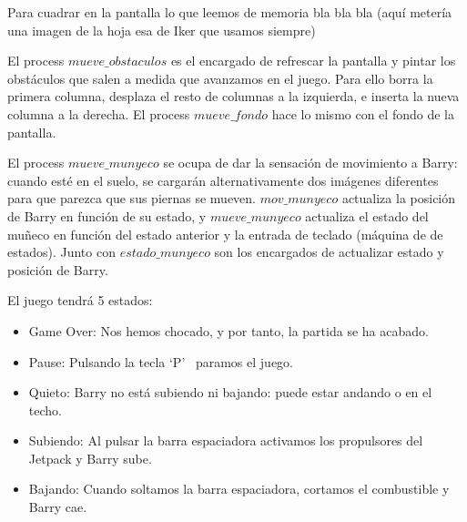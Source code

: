 \documentclass[11pt, a4paper, spanish, openright, twoside]{book}
\begin{document}
Para cuadrar en la pantalla lo que leemos de memoria bla bla bla (aquí metería una imagen de la hoja esa de Iker que usamos siempre)

El process $mueve\_obstaculos$ es el encargado de refrescar la pantalla y pintar los obstáculos que salen a medida que avanzamos en el juego. Para ello borra la primera columna, desplaza el resto de columnas a la izquierda, e inserta la nueva columna a la derecha. El process $mueve\_fondo$ hace lo mismo con el fondo de la pantalla.

El process $mueve\_munyeco$ se ocupa de dar la sensación de movimiento a Barry: cuando esté en el suelo, se cargarán alternativamente dos imágenes diferentes para que parezca que sus piernas se mueven.
$mov\_munyeco$ actualiza la posición de Barry en función de su estado, y $mueve\_munyeco$ actualiza el estado del muñeco en función del estado anterior y la entrada de teclado (máquina de de estados). Junto con $estado\_munyeco$ son los encargados de actualizar estado y posición de Barry.

El juego tendrá 5 estados:
\begin{itemize}
\item Game Over: Nos hemos chocado, y por tanto, la partida se ha acabado.
\item Pause: Pulsando la tecla `P'  \ paramos el juego.
\item Quieto: Barry no está subiendo ni bajando: puede estar andando o en el techo.
\item Subiendo: Al pulsar la barra espaciadora activamos los propulsores del Jetpack y Barry sube.
\item Bajando: Cuando soltamos la barra espaciadora, cortamos el combustible y Barry cae.
\end{itemize}
\end{document}
